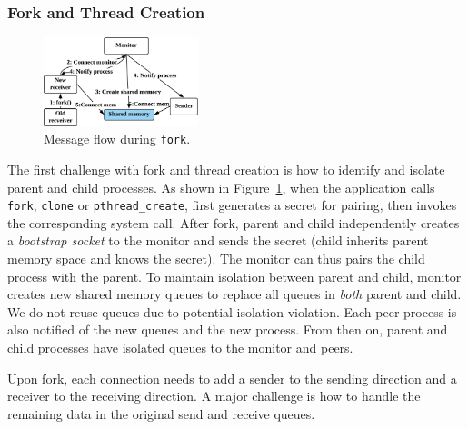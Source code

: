 
\subsubsection{Fork and Thread Creation}
\label{subsubsec:fork_fork}


\begin{figure}[t]
	\centering
	\includegraphics[width=0.4\textwidth]{images/fork}
	\caption{Message flow during \texttt{fork}.}
	\label{fig:fork-fork}
\end{figure}


The first challenge with fork and thread creation is how to identify and isolate parent and child processes. As shown in Figure~\ref{fig:fork-fork}, when the application calls \texttt{fork}, \texttt{clone} or \texttt{pthread\_create}, \libipc{} first generates a secret for pairing, then invokes the corresponding system call. After fork, parent and child independently creates a \textit{bootstrap socket} to the monitor and sends the secret (child inherits parent memory space and knows the secret). The monitor can thus pairs the child process with the parent. 
To maintain isolation between parent and child, monitor creates new shared memory queues to replace all queues in \emph{both} parent and child. We do not reuse queues due to potential isolation violation. %
Each peer process is also notified of the new queues and the new process. From then on, parent and child processes have isolated queues to the monitor and peers.

Upon fork, each connection needs to add a sender to the sending direction and a receiver to the receiving direction. A major challenge is how to handle the remaining data in the original send and receive queues.

